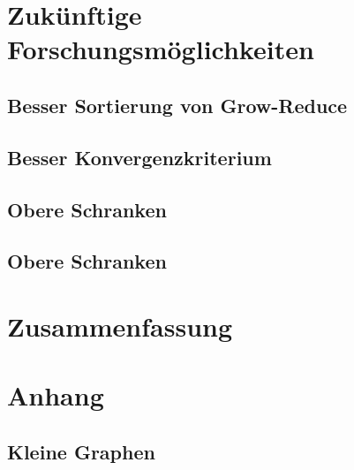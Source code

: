 \documentclass[12pt,a4paper,onecolumn,oneside,titlepage]{article}
\begin{document}
\section{Zukünftige Forschungsmöglichkeiten}
\subsection{Besser Sortierung von Grow-Reduce}
\subsection{Besser Konvergenzkriterium}
\subsection{Obere Schranken}
\subsection{Obere Schranken}
\section{Zusammenfassung}

\section{Anhang}
\subsection{Kleine Graphen}



\end{document}
